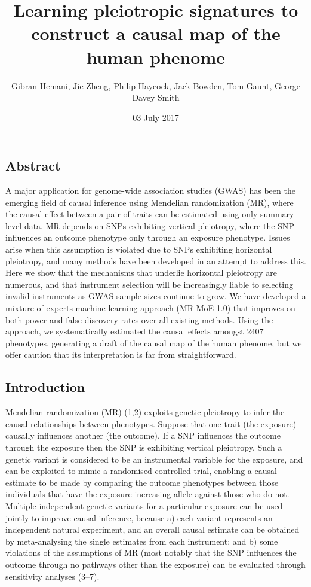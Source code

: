 \documentclass[]{article}
\title{Learning pleiotropic signatures to construct a causal map of the human
phenome}
\author{Gibran Hemani, Jie Zheng, Philip Haycock, Jack Bowden, Tom Gaunt, George
Davey Smith}
\date{03 July 2017}
\begin{document}
\maketitle

\subsection{Abstract}\label{abstract}

A major application for genome-wide association studies (GWAS) has been
the emerging field of causal inference using Mendelian randomization
(MR), where the causal effect between a pair of traits can be estimated
using only summary level data. MR depends on SNPs exhibiting vertical
pleiotropy, where the SNP influences an outcome phenotype only through
an exposure phenotype. Issues arise when this assumption is violated due
to SNPs exhibiting horizontal pleiotropy, and many methods have been
developed in an attempt to address this. Here we show that the
mechanisms that underlie horizontal pleiotropy are numerous, and that
instrument selection will be increasingly liable to selecting invalid
instruments as GWAS sample sizes continue to grow. We have developed a
mixture of experts machine learning approach (MR-MoE 1.0) that improves
on both power and false discovery rates over all existing methods. Using
the approach, we systematically estimated the causal effects amongst
2407 phenotypes, generating a draft of the causal map of the human
phenome, but we offer caution that its interpretation is far from
straightforward.

\subsection{Introduction}\label{introduction}

Mendelian randomization (MR) (1,2) exploits genetic pleiotropy to infer
the causal relationships between phenotypes. Suppose that one trait (the
exposure) causally influences another (the outcome). If a SNP influences
the outcome through the exposure then the SNP is exhibiting vertical
pleiotropy. Such a genetic variant is considered to be an instrumental
variable for the exposure, and can be exploited to mimic a randomised
controlled trial, enabling a causal estimate to be made by comparing the
outcome phenotypes between those individuals that have the
exposure-increasing allele against those who do not. Multiple
independent genetic variants for a particular exposure can be used
jointly to improve causal inference, because a) each variant represents
an independent natural experiment, and an overall causal estimate can be
obtained by meta-analysing the single estimates from each instrument;
and b) some violations of the assumptions of MR (most notably that the
SNP influences the outcome through no pathways other than the exposure)
can be evaluated through sensitivity analyses (3--7).
\end{document}
